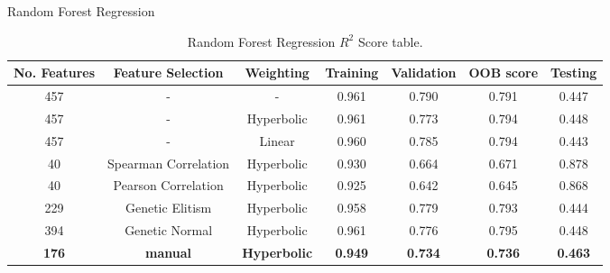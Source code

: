 \documentclass{beamer}
\begin{document}
\begin{frame}[t]{Random Forest Regression}
\begin{table} [h!]
\centering
\resizebox{0.7\linewidth}{!} {
 \begin{tabular}{ | c | c |  c | c | c | c | c |}
\hline
\textbf{No.  Features} & \textbf{Feature Selection} & \textbf{Weighting} & \textbf{Training} & \textbf{Validation} & \textbf{OOB score} & \textbf{Testing} \\ [0.5 ex]
\hline \hline
457 & - & - & 0.961 & 0.790 & 0.791 & 0.447\\
457 & - & Hyperbolic &  0.961 & 0.773 & 0.794 & 0.448\\
457 & - & Linear &  0.960 & 0.785 & 0.794 & 0.443\\
40 & Spearman Correlation & Hyperbolic &  0.930 & 0.664 & 0.671 & 0.878  \\ 
40 & Pearson Correlation & Hyperbolic &  0.925 & 0.642 & 0.645 & 0.868  \\ 
229 & Genetic Elitism & Hyperbolic  & 0.958 &  0.779 & 0.793 & 0.444 \\
394 & Genetic Normal& Hyperbolic & 0.961 & 0.776 & 0.795 & 0.448 \\
\textbf{176} & \textbf{manual}  & \textbf{Hyperbolic} &  \textbf{0.949} & \textbf{0.734} & \textbf{0.736} & \textbf{0.463}  \\ [1ex]
\hline
\end{tabular}
}
\caption{Random Forest Regression $R^2$ Score table.}
\label {table:3}
\end{table}

\end{frame}
\end{document}
